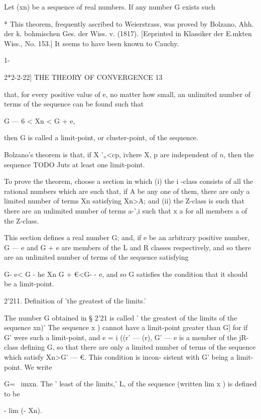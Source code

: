 Let (xn) be a sequence of real numbers. If any number G exists such 

* This theorem, frequently ascribed to Weierstrass, was proved by Bolzano, Ahh. der k. 
bohmischen Ges. der Wiss. v. (1817). [Eeprinted in Klassiker der E.mkten Wiss., No. 153.] It 
seems to have been known to Cauchy. 



1- 



2*2-2-22] THE THEORY OF CONVERGENCE 13 

that, for every positive value of e, no matter how small, an unlimited number 
of terms of the sequence can be found such that 

G — 6 < Xn < G + e, 

then G is called a limit-point, or cluster-point, of the sequence. 

Bolzano's theorem is that, if X  '„<cp, ivhere X, p are independent of $n$, 
then the sequence TODO Juts at least one limit-point. 

To prove the theorem, choose a section in which (i) the i -class consists 
of all the rational numbers which are such that, if A be any one of them, 
there are only a limited number of terms Xn satisfying Xn>A; and (ii) the 
Z-class is such that there are an unlimited number of terms a-',i such that x  a 
for all members a of the Z-class. 

This section defines a real number G; and, if e be an arbitrary positive 
number, G —  e and G +  e are members of the L and R classes respectively, 
and so there are an unlimited number of terms of the sequence satisfying 

G- e< G - he Xn G +  €<G- - e, 
and so G satisfies the condition that it should be a limit-point. 

2'211. Definition of 'the greatest of tlie limits.' 

The number G obtained in § 2'21 is called ' the greatest of the limits of 
the sequence  xn)' The sequence  x ) cannot have a limit-point greater 
than G] for if G' were such a limit-point, and e = i ((r' — (r), G' — e is a 
member of the jR-class defining G, so that there are only a limited number of 
terms of the sequence which satisfy Xn>G' — €. This condition is incon- 
sistent with G' being a limit-point. We write 

G= \ imxn. 
The ' least of the limits,' L, of the sequence (written lim x ) is defined to be 

- lim (- Xn). 

